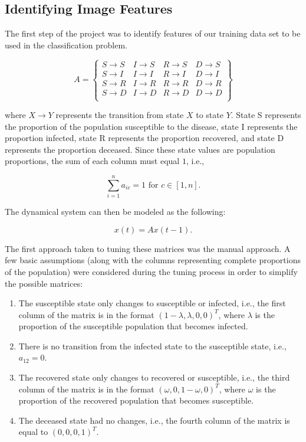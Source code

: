 \documentclass[conference]{IEEEtran}
\begin{document}
\subsection{Identifying Image Features}
The first step of the project was to identify features of our training data set to be used in the classification problem. 

\begin{equation}
A = \begin{Bmatrix}
  S \rightarrow S & I \rightarrow S & R \rightarrow S & D \rightarrow S \\
  S \rightarrow I & I \rightarrow I & R \rightarrow I & D \rightarrow I \\ 
  S \rightarrow R & I \rightarrow R & R \rightarrow R & D \rightarrow R \\
  S \rightarrow D & I \rightarrow D & R \rightarrow D & D \rightarrow D \\
\end{Bmatrix}
\end{equation}

where $X \rightarrow Y$ represents the transition from state $X$ to state $Y$. State S represents the proportion of the population susceptible to the disease, state I represents the proportion infected, state R represents the proportion recovered, and state D represents the proportion deceased. Since these state values are population proportions, the sum of each column must equal $1$, i.e.,

\begin{equation}
\sum_{i=1}^{n} a_{ic} = 1 \mbox{ for } c \in [1, n].
\end{equation}

The dynamical system can then be modeled as the following:

\begin{equation}
x(t) = Ax(t - 1).
\end{equation}

The first approach taken to tuning these matrices was the manual approach. A few basic assumptions (along with the columns representing complete proportions of the population) were considered during the tuning process in order to simplify the possible matrices:
\begin{enumerate}
  \item The susceptible state only changes to susceptible or infected, i.e., the first column of the matrix is in the format $(1 - \lambda, \lambda, 0, 0)^T$, where $\lambda$ is the proportion of the susceptible population that becomes infected.
  \item There is no transition from the infected state to the susceptible state, i.e., $a_{12} = 0$.
  \item The recovered state only changes to recovered or susceptible, i.e., the third column of the matrix is in the format $(\omega, 0, 1 - \omega, 0)^T$, where $\omega$ is the proportion of the recovered population that becomes susceptible.
  \item The deceased state had no changes, i.e., the fourth column of the matrix is equal to $(0, 0, 0, 1)^T$.
\end{enumerate}
\end{document}
